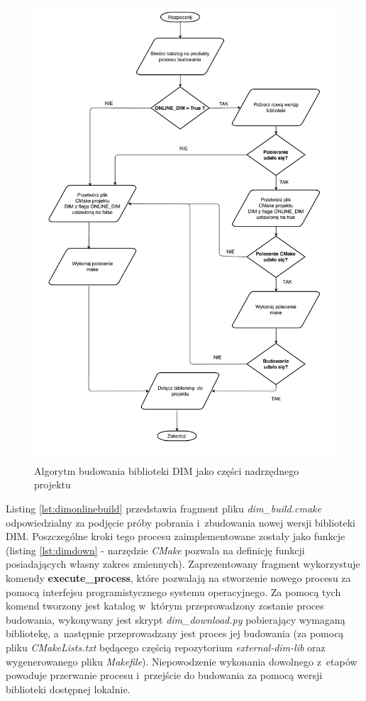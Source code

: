 \begin{figure}
\centering
\includegraphics[height=0.9\textheight]{res/DIMAlgo.pdf}
\caption{Algorytm budowania biblioteki DIM jako części nadrzędnego projektu}
\label{fig:dimalgo}
\end{figure}


Listing \ref{lst:dimonlinebuild} przedstawia fragment pliku \textit{dim\_build.cmake} odpowiedzialny za podjęcie próby pobrania i~zbudowania nowej wersji biblioteki DIM. Poszczególne kroki tego procesu zaimplementowane zostały jako funkcje (listing \ref{lst:dimdown} - narzędzie \textit{CMake} pozwala na definicję funkcji posiadających własny zakres zmiennych). Zaprezentowany fragment wykorzystuje komendy \textbf{execute\_process}, które pozwalają na stworzenie nowego procesu za pomocą interfejsu programistycznego systemu operacyjnego. Za pomocą tych komend tworzony jest katalog w~którym przeprowadzony zostanie proces budowania, wykonywany jest skrypt \textit{dim\_download.py} pobierający wymaganą bibliotekę, a~następnie przeprowadzany jest proces jej budowania (za pomocą pliku \textit{CMakeLists.txt} będącego częścią repozytorium \textit{external-dim-lib} oraz wygenerowanego pliku \textit{Makefile}). Niepowodzenie wykonania dowolnego z~etapów powoduje przerwanie procesu i~przejście do budowania za pomocą wersji biblioteki dostępnej lokalnie.


